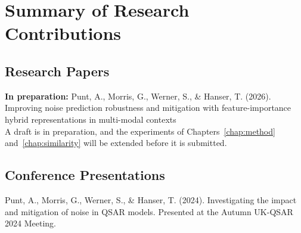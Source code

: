 \pagebreak
\chapter*{Summary of Research Contributions}


\section*{Research Papers}

\textbf{In preparation:} Punt, A., Morris, G., Werner, S., \& Hanser, T. (2026). Improving noise prediction robustness and mitigation with feature-importance hybrid representations in multi-modal contexts \\ A draft is in preparation, and the experiments of Chapters~\ref{chap:method} and~\ref{chap:similarity} will be extended before it is submitted.

\section*{Conference Presentations}
Punt, A., Morris, G., Werner, S., \& Hanser, T. (2024). Investigating the impact and mitigation of noise in QSAR models. Presented at the Autumn UK-QSAR 2024 Meeting.


